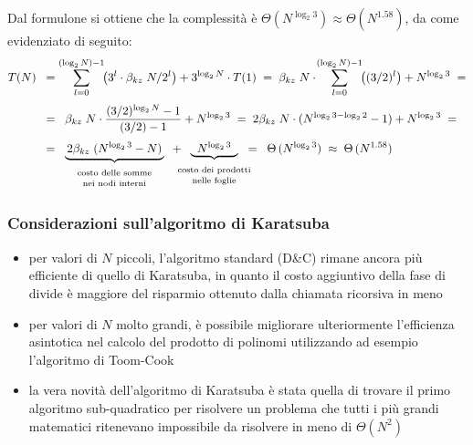 Dal formulone si ottiene che la complessità è \(\Theta(N^{\log_2 3}) \approx \Theta(N^{1.58})\), da come evidenziato di seguito:
\begin{align*}
	T(N) \;\; &= \sum_{l=0}^{(\log_2 N) - 1} \!\! \left( 3^l \cdot \beta_{kz} \; N / 2^l \right) + 3^{\log_2 N} \cdot T(1) \; =  \; \beta_{kz} \; N \cdot \! \sum_{l=0}^{(\log_2 N) - 1} \!\! \left( (3/2)^l \right) + N^{\log_2 3} \; = \\[3pt]
	&= \;\; \beta_{kz} \; N \cdot \frac{(3/2)^{\log_2 N} - 1}{(3/2) - 1} + N^{\log_2 3} \; = \; 2 \beta_{kz} \; N \cdot (N^{\log_2 3 - \log_2 2} - 1) + N^{\log_2 3} \; = \\[3pt]
	&= \;\; \underbrace{\, 2 \beta_{kz} \; (N^{\log_2 3} - N) \,}_{\begin{array}{c} \text{\scriptsize costo delle somme} \\[-3pt] \text{\scriptsize nei nodi interni} \end{array}}
	\;\; + \!\!\!\!\!\! \underbrace{\;\;N^{\log_2 3}\;\;}_{\begin{array}{c} \text{\scriptsize costo dei prodotti} \\[-3pt] \text{\scriptsize nelle foglie} \end{array}} \!\!\!\!\!\! = \;\; \Theta \, (N^{\log_2 3}) \; \approx \; \Theta \, (N^{1.58})
\end{align*}

\subsubsection*{Considerazioni sull'algoritmo di Karatsuba}
\begin{itemize}
	\item per valori di \(N\) piccoli, l'algoritmo standard (D\&C) rimane ancora più efficiente di quello di Karatsuba,
	in quanto il costo aggiuntivo della fase di divide è maggiore del risparmio ottenuto dalla chiamata ricorsiva in meno
	\item per valori di \(N\) molto grandi, è possibile migliorare ulteriormente l'efficienza asintotica nel calcolo del
	prodotto di polinomi utilizzando ad esempio l'algoritmo di Toom-Cook
	\item la vera novità dell'algoritmo di Karatsuba è stata quella di trovare il primo algoritmo sub-quadratico per
	risolvere un problema che tutti i più grandi matematici ritenevano impossibile da risolvere in meno di \(\Theta(N^2)\)
\end{itemize}

\newpage


